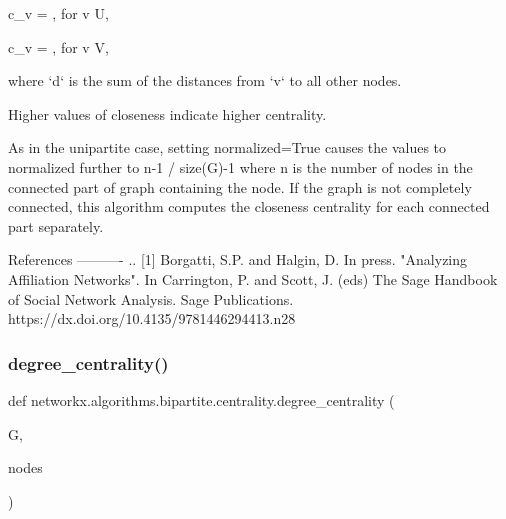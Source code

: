 \begin{DoxyVerb}
    c_{v} = , \mbox{for} v \in U,

    c_{v} = , \mbox{for} v \in V,

where `d` is the sum of the distances from `v` to all
other nodes.

Higher values of closeness  indicate higher centrality.

As in the unipartite case, setting normalized=True causes the
values to normalized further to n-1 / size(G)-1 where n is the
number of nodes in the connected part of graph containing the
node.  If the graph is not completely connected, this algorithm
computes the closeness centrality for each connected part
separately.

References
----------
.. [1] Borgatti, S.P. and Halgin, D. In press. "Analyzing Affiliation
    Networks". In Carrington, P. and Scott, J. (eds) The Sage Handbook
    of Social Network Analysis. Sage Publications.
    https://dx.doi.org/10.4135/9781446294413.n28
\end{DoxyVerb}
 \mbox{\label{namespacenetworkx_1_1algorithms_1_1bipartite_1_1centrality_a98a64581dd9879f03a3c698f360bab2d}} 
\subsubsection{\texorpdfstring{degree\+\_\+centrality()}{degree\_centrality()}}
{\footnotesize\ttfamily def networkx.\+algorithms.\+bipartite.\+centrality.\+degree\+\_\+centrality (\begin{DoxyParamCaption}\item[{}]{G,  }\item[{}]{nodes }\end{DoxyParamCaption})}

